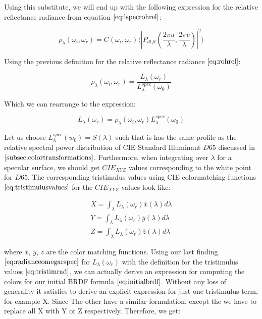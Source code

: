 Using this substitute, we will end up with the following expression for the relative reflectance radiance from equation $\ref{eq:lspecrohrel}$:

\begin{equation}
\rho_\lambda(\omega_i,\omega_r) =  C(\omega_i,\omega_r) \langle \left|P_{dtft}(\frac{2\pi u}{\lambda}, \frac{2\pi v}{\lambda})\right|^2\rangle
\label{eq:cpterm}
\end{equation}

Using the previous definition for the relative reflectance radiance $\ref{eq:rohrel}$:

\begin{equation}
 \rho_\lambda(\omega_i,\omega_r) = \frac{L_\lambda(\omega_r)}{L_\lambda^{spec}(\omega_0)} 
\end{equation}

Which we can rearrange to the expression: 

\begin{equation}
L_\lambda(\omega_r) = \rho_\lambda(\omega_i,\omega_r)L_\lambda^{spec}(\omega_0)
\label{eq:radianceomegarspec}
\end{equation}

Let us choose $L_\lambda^{spec}(w_0) = S(\lambda)$ such that is has the same profile as the relative spectral power distribution of CIE Standard Illuminant $D65$ discussed in $\ref{subsec:colortransformations}$. Furthermore, when integrating over $\lambda$ for a specular surface, we should get $CIE_{XYZ}$ values corresponding to the white point for $D65$. The corresponding tristimulus values using CIE colormatching functions $\ref{eq:tristimulusvalues}$ for the $CIE_{XYZ}$ values look like:

\begin{align}
X = \int_{\lambda}L_\lambda(\omega_r)\overline{x}(\lambda)d\lambda \nonumber \\
Y = \int_{\lambda}L_\lambda(\omega_r)\overline{y}(\lambda)d\lambda \nonumber \\
Z = \int_{\lambda}L_\lambda(\omega_r)\overline{z}(\lambda)d\lambda
\label{eq:tristimrad}
\end{align}

where $\overline{x}$, $\overline{y}$, $\overline{z}$ are the color matching functions. Using our last finding $\ref{eq:radianceomegarspec}$ for $L_\lambda(\omega_r)$ with the definition for the tristimulus values $\ref{eq:tristimrad}$, we can actually derive an expression for computing the colors for our initial BRDF formula $\ref{eq:initialbrdf}$. 
Without any loss of generality it satisfies to derive an explicit expression for just one tristimulus term, for example X. Since The other have a similar formulation, except the we have to replace all X with Y or Z respectively. Therefore, we get:

